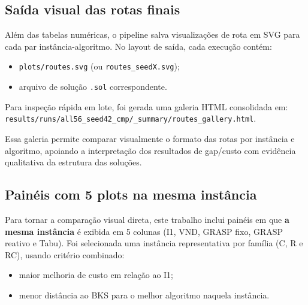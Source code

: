 \subsection{Saída visual das rotas finais}

Além das tabelas numéricas, o pipeline salva visualizações de rota em SVG para cada par instância-algoritmo.
No layout de saída, cada execução contém:
\begin{itemize}
  \item \texttt{plots/routes.svg} (ou \texttt{routes\_seedX.svg});
  \item arquivo de solução \texttt{.sol} correspondente.
\end{itemize}

Para inspeção rápida em lote, foi gerada uma galeria HTML consolidada em:
\texttt{results/runs/all56\_seed42\_cmp/\_summary/routes\_gallery.html}.

Essa galeria permite comparar visualmente o formato das rotas por instância e algoritmo, apoiando a interpretação dos resultados de gap/custo com evidência qualitativa da estrutura das soluções.

\subsection{Painéis com 5 plots na mesma instância}
\label{subsec:painel_5plots}

Para tornar a comparação visual direta, este trabalho inclui painéis em que \textbf{a mesma instância} é exibida em 5 colunas (I1, VND, GRASP fixo, GRASP reativo e Tabu).
Foi selecionada uma instância representativa por família (C, R e RC), usando critério combinado:
\begin{itemize}
  \item maior melhoria de custo em relação ao I1;
  \item menor distância ao BKS para o melhor algoritmo naquela instância.
\end{itemize}

